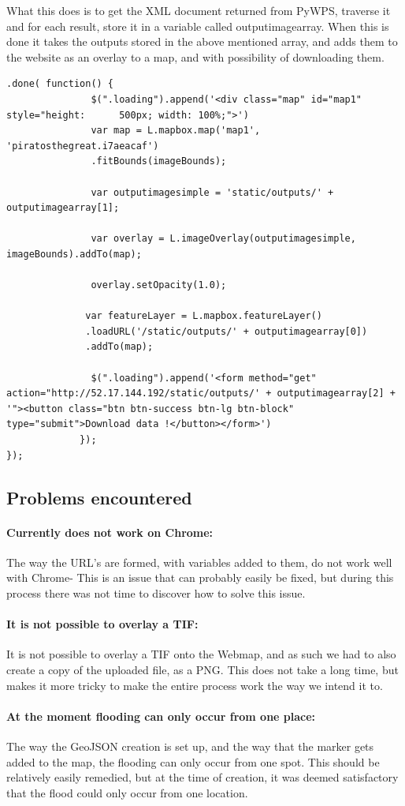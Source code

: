 What this does is to get the XML document returned from PyWPS, traverse it and for each result, store it in a variable called outputimagearray.
When this is done it takes the outputs stored in the above mentioned array, and adds them to the website as an overlay to a map, and with possibility of downloading them.

\begin{lstlisting}
.done( function() {
               $(".loading").append('<div class="map" id="map1" style="height: 		500px; width: 100%;">')
               var map = L.mapbox.map('map1', 'piratosthegreat.i7aeacaf')
               .fitBounds(imageBounds);

               var outputimagesimple = 'static/outputs/' + outputimagearray[1];

               var overlay = L.imageOverlay(outputimagesimple, 				imageBounds).addTo(map);

               overlay.setOpacity(1.0);

              var featureLayer = L.mapbox.featureLayer()
              .loadURL('/static/outputs/' + outputimagearray[0])
              .addTo(map);

               $(".loading").append('<form method="get" action="http://52.17.144.192/static/outputs/' + outputimagearray[2] + '"><button class="btn btn-success btn-lg btn-block" type="submit">Download data !</button></form>')
             });
});
\end{lstlisting}

\subsection{Problems encountered}
\paragraph{Currently does not work on Chrome:} The way the URL's are formed, with variables added to them, do not work well with Chrome- This is an issue that can probably easily be fixed, but during this process there was not time to discover how to solve this issue. 

\paragraph{It is not possible to overlay a TIF:}
It is not possible to overlay a TIF onto the Webmap, and as such we had to also create a copy of the uploaded file, as a PNG. This does not take a long time, but makes it more tricky to make the entire process work the way we intend it to.  

\paragraph{At the moment flooding can only occur from one place:}
The way the GeoJSON creation is set up, and the way that the marker gets added to the map, the flooding can only occur from one spot. This should be relatively easily remedied, but at the time of creation, it was deemed satisfactory that the flood could only occur from one location.

